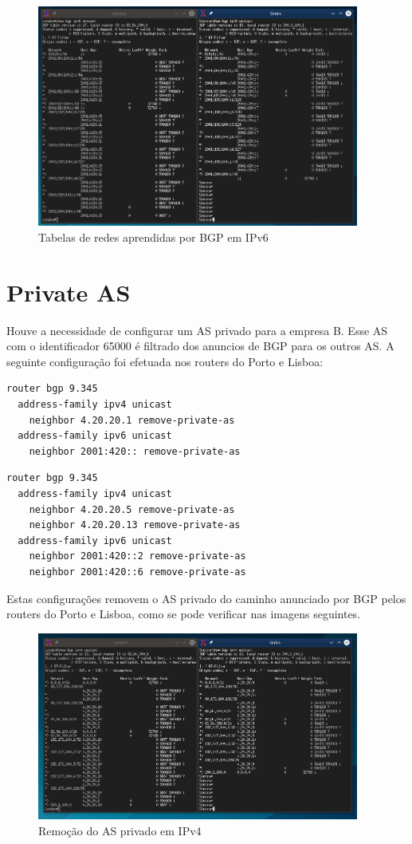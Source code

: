 \documentclass[11pt,a4paper]{report}
\begin{document}
\begin{figure}[H]
\centerline{\includegraphics[width=300pt]{private_as_removal_ipv6.png}}
\caption{Tabelas de redes aprendidas por BGP em IPv6}
\label{schema}
\end{figure}

\section{Private AS}
Houve a necessidade de configurar um AS privado para a empresa B. Esse AS com o identificador 65000 é filtrado dos anuncios de BGP para os outros AS. A seguinte configuração foi efetuada nos routers do Porto e Lisboa:

\begin{lstlisting}[caption=Remoção do AS privado - Router Porto]
router bgp 9.345
  address-family ipv4 unicast
    neighbor 4.20.20.1 remove-private-as
  address-family ipv6 unicast
  	neighbor 2001:420:: remove-private-as
\end{lstlisting}

\begin{lstlisting}[caption=Remoção do AS privado - Router Lisboa]
router bgp 9.345
  address-family ipv4 unicast
    neighbor 4.20.20.5 remove-private-as
    neighbor 4.20.20.13 remove-private-as
  address-family ipv6 unicast
  	neighbor 2001:420::2 remove-private-as
  	neighbor 2001:420::6 remove-private-as
\end{lstlisting}

Estas configurações removem o AS privado do caminho anunciado por BGP pelos routers do Porto e Lisboa, como se pode verificar nas imagens seguintes.

\begin{figure}[H]
\centerline{\includegraphics[width=300pt]{private_as_removal_ipv4.png}}
\caption{Remoção do AS privado em IPv4}
\label{schema}
\end{figure}
\end{document}
